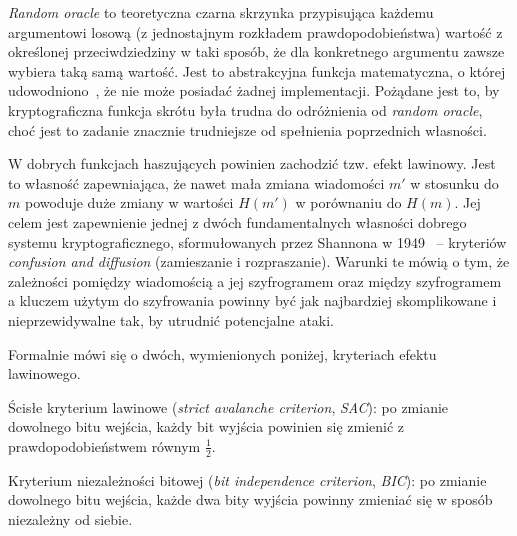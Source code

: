 \documentclass[12pt,a4paper,twoside]{article}
\begin{document}
\textit{Random oracle} to teoretyczna czarna skrzynka przypisująca każdemu
argumentowi losową (z jednostajnym rozkładem prawdopodobieństwa) wartość z
określonej przeciwdziedziny w taki sposób, że dla konkretnego argumentu zawsze
wybiera taką samą wartość. Jest to abstrakcyjna funkcja matematyczna, o której
udowodniono~\cite{randomoracle}, że nie może posiadać żadnej implementacji.
Pożądane jest to, by kryptograficzna funkcja skrótu była trudna do odróżnienia
od \textit{random oracle}, choć jest to zadanie znacznie trudniejsze od
spełnienia poprzednich własności.

\label{sec:avalance_effect}
W dobrych funkcjach haszujących powinien zachodzić tzw. efekt lawinowy. Jest to
własność zapewniająca, że nawet mała zmiana wiadomości $m'$ w stosunku do $m$
powoduje duże zmiany w wartości $H(m')$ w porównaniu do $H(m)$. Jej celem jest
zapewnienie jednej z dwóch fundamentalnych własności dobrego systemu
kryptograficznego, sformułowanych przez Shannona w
1949~\cite{confusion_diffusion} -- kryteriów \textit{confusion and diffusion}
(zamieszanie i rozpraszanie). Warunki te mówią o tym, że zależności pomiędzy
wiadomością a jej szyfrogramem oraz między szyfrogramem a kluczem użytym do
szyfrowania powinny być jak najbardziej skomplikowane i nieprzewidywalne tak,
by utrudnić potencjalne ataki.

Formalnie mówi się o dwóch, wymienionych poniżej, kryteriach efektu lawinowego.

\begin{myenumerate}
\item Ścisłe kryterium lawinowe (\textit{strict avalanche criterion},
\textit{SAC}): po zmianie dowolnego bitu wejścia, każdy bit wyjścia powinien
się zmienić z prawdopodobieństwem równym $\frac{1}{2}$.
\item Kryterium niezależności bitowej (\textit{bit independence criterion},
\textit{BIC}): po zmianie dowolnego bitu wejścia, każde dwa bity wyjścia
powinny zmieniać się w sposób niezależny od siebie.
\end{myenumerate}
\end{document}
